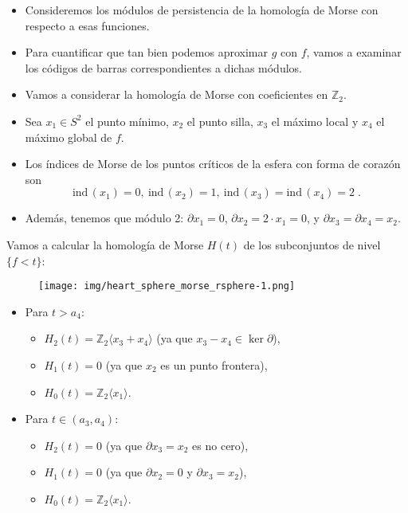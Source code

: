 \documentclass{beamer}
\newcommand{\de}{\partial}
\def\Z{\mathbb{Z}}
\def\ind{{\mbox {ind}}\,}
\begin{document}
\begin{frame}{}
\begin{itemize}
    \item Consideremos los módulos de persistencia de la homología de Morse con respecto a esas funciones. \\[0.3cm]\pause
    \item Para cuantificar que tan bien podemos aproximar $g$ con $f$, vamos a examinar los códigos de barras correspondientes a dichas módulos. \\[0.3cm] \pause 
    \item Vamos a considerar la homología de Morse con coeficientes en $\Z_2$. \\[0.3cm] \pause
    \item Sea $x_1 \in S^2$ el punto mínimo, $x_2$ el punto silla, $x_3$ el máximo local y $x_4$ el máximo global de $f$. \\[0.3cm] \pause 
    \item Los índices de Morse de los puntos críticos de la esfera con forma de corazón son
$$
	\ind (x_1) = 0,\ \ind (x_2) = 1,\ \ind(x_3)= \ind (x_4) = 2 \;.
$$ \pause
    \item Además, tenemos que módulo 2: $\de x_1 = 0$, $\de x_2 = 2\cdot x_1 = 0$, y $\de x_3 = \de x_4 = x_2$.
\end{itemize}
 




\end{frame}

\begin{frame}{}
Vamos a calcular la homología de Morse $H (t)$ de los subconjuntos de nivel $\{ f < t\}$: \pause
\begin{figure}[!ht]
	\centering
	\texttt{[image: img/heart\_sphere\_morse\_rsphere-1.png]}

	\label{fig: heart_sphere_morse_rsphere}
\end{figure}
\begin{itemize}
	\item
		Para $t>a_4$:
  \begin{itemize}
      \item $H_2 (t) = \Z_2 \langle x_3 + x_4 \rangle$ (ya que $x_3 - x_4 \in \ker \de$),
      \item $H_1 (t) = 0$ (ya que $x_2$ es un punto frontera),
      \item $H_0 (t) = \Z_2 \langle x_1 \rangle$. \\[0.2cm] \pause
  \end{itemize}
	\item
		Para $t\in (a_3, a_4)$:
  \begin{itemize}
      \item $H_2 (t) = 0$ (ya que $\de x_3 = x_2$ es no cero),
      \item $H_1 (t) = 0$ (ya que $\de x_2 = 0$ y $\de x_3 = x_2$),
      \item $H_0 (t) = \Z_2 \langle x_1 \rangle$.
  \end{itemize}
	
\end{itemize}
\end{frame}
\end{document}
